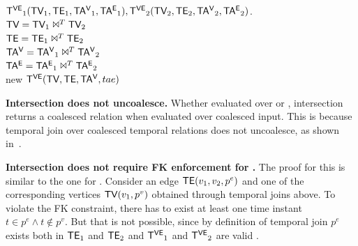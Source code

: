 \begin{algorithm}
\caption{Temporal graph intersection in \tve.}
\begin{algorithmic}[1]
\REQUIRE $\mathsf{T^{VE}}_1 (\textsf{TV}_1, \textsf{TE}_1, \mathsf{TA^{V}}_1, \mathsf{TA^{E}}_1), \mathsf{T^{VE}}_2 (\textsf{TV}_2, \textsf{TE}_2, \mathsf{TA^{V}}_2, \mathsf{TA^{E}}_2)$.\\
\STATE $\textsf{TV} = \textsf{TV}_1 \Join^T \textsf{TV}_2$\\
\STATE $\textsf{TE} = \textsf{TE}_1 \Join^T \textsf{TE}_2$\\
\STATE $\mathsf{TA^{V}} = \mathsf{TA^{V}}_1 \Join^T \mathsf{TA^{V}}_2$\\
\STATE $\mathsf{TA^{E}} = \mathsf{TA^{E}}_1 \Join^T \mathsf{TA^{E}}_2$\\
\RETURN new $\mathsf{T^{VE}} (\textsf{TV}, \textsf{TE}, \mathsf{TA^{V}}, tae)$\\
\end{algorithmic}
\label{alg:inter}
\end{algorithm}


{\bf Intersection does not uncoalesce.}  Whether evaluated over \trg
or \tve, intersection returns a coalesced relation when evaluated over
coalesced input.  This is because temporal join over coalesced
temporal relations does not uncoalesce, as shown
in~\cite{DBLP:conf/vldb/BohlenSS96}.

{\bf Intersection does not require FK enforcement for \tve.}  The
proof for this is similar to the one for .  Consider an
edge $\textsf{TE}(v_1, v_2, p^e)$ and one of the corresponding vertices
$\textsf{TV}(v_1, p^v)$ obtained through temporal joins above.  To violate the
FK constraint, there has to exist at least one time instant $t \in p^e
\wedge t \not\in p^v$.  But that is not possible, since by definition
of temporal join $p^e$ exists both in $\textsf{TE}_1$ and $\textsf{TE}_2$ and $\mathsf{T^{VE}}_1$
and $\mathsf{T^{VE}}_2$ are valid \tgs.


